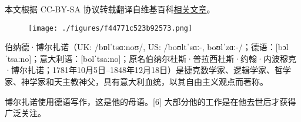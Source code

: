 
本文根据 CC-BY-SA 协议转载翻译自维基百科\href{https://en.wikipedia.org/wiki/Bernard_Bolzano}{相关文章}。

\begin{figure}[ht]
\centering
\texttt{[image: ./figures/f44771c523b92573.png]}
\caption{} \label{fig_Bolzan_1}
\end{figure}
伯纳德·博尔扎诺（UK: /bɒlˈtsɑːnoʊ/, US: /boʊltˈsɑː-, boʊlˈzɑː-/；德语：[bɔlˈtsaːno]；意大利语：[bolˈtsaːno]；原名伯纳尔杜斯·普拉西杜斯·约翰·内波穆克·博尔扎诺；1781年10月5日–1848年12月18日）是捷克数学家、逻辑学家、哲学家、神学家和天主教神父，具有意大利血统，以其自由主义观点而著称。

博尔扎诺使用德语写作，这是他的母语。[6] 大部分他的工作是在他去世后才获得广泛关注。